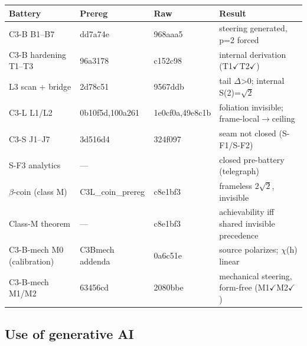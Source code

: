 \documentclass[
  11pt]{article}
\newcounter{none} %
\begin{document}
{\def\LTcaptype{none} %
\begin{longtable}[]{@{}
  >{\raggedright\arraybackslash}p{}
  >{\raggedright\arraybackslash}p{}
  >{\raggedright\arraybackslash}p{}
  >{\raggedright\arraybackslash}p{}@{}}
\toprule\noalign{}
\begin{minipage}[b]{\linewidth}\raggedright
Battery
\end{minipage} & \begin{minipage}[b]{\linewidth}\raggedright
Prereg
\end{minipage} & \begin{minipage}[b]{\linewidth}\raggedright
Raw
\end{minipage} & \begin{minipage}[b]{\linewidth}\raggedright
Result
\end{minipage} \\
\midrule\noalign{}
\endhead
\bottomrule\noalign{}
\endlastfoot
C3-B B1--B7 & dd7a74e & 968aaa5 & steering generated, p=2 forced \\
C3-B hardening T1--T3 & 96a3178 & c152c98 & internal derivation
(T1\(\checkmark\)T2\(\checkmark\)) \\
L3 scan + bridge & 2d78c51 & 9567ddb & tail $\Delta$\textgreater0; internal
S(2)=$\sqrt{2}$ \\
C3-L L1/L2 & 0b10f5d,100a261 & 1e0cf0a,49e8c1b & foliation invisible;
frame-local$\to$ceiling \\
C3-S J1--J7 & 3d516d4 & 324f097 & seam not closed (S-F1/S-F2) \\
S-F3 analytics & --- & 2053106 & closed pre-battery (telegraph) \\
$\beta$-coin (class M) & C3L\_coin\_prereg & c8e1bf3 & frameless $2\sqrt{2}$,
invisible \\
Class-M theorem & --- & c8e1bf3 & achievability iff shared invisible
precedence \\
C3-B-mech M0 (calibration) & C3Bmech addenda & 0a6c51e & source
polarizes; $\chi$(h) linear \\
C3-B-mech M1/M2 & 63456cd & 2080bbe & mechanical steering, form-free
(M1\(\checkmark\)M2\(\checkmark\)) \\
\end{longtable}
}

\subsection{Use of generative AI}\label{use-of-generative-ai}
\end{document}
